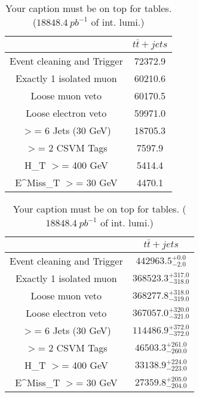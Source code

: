 \documentclass{article}
\begin{document}
\begin{table}
\caption{Your caption must be on top for tables. ($18848.4~pb^{-1}$ of int. lumi.)}
\label{tab:}
\centering
\begin{tabular}{|c|c|}
\toprule
&$t\bar{t}+jets$	\\

\midrule
Event cleaning and Trigger&	72372.9	\\

Exactly 1 isolated muon&	60210.6	\\

Loose muon veto&	60170.5	\\

Loose electron veto&	59971.0	\\

$>$= 6 Jets (30 GeV)&	18705.3	\\

$>$= 2 CSVM Tags&	7597.9	\\

H_{T} $>$=  400 GeV&	5414.4	\\

E^{Miss}_{T} $>$=  30 GeV&	4470.1	\\

\bottomrule
\end{tabular}
\end{table}
\begin{table}
\caption{Your caption must be on top for tables. ($18848.4~pb^{-1}$ of int. lumi.)}
\label{tab:}
\centering
\begin{tabular}{|c|c|}
\toprule
&$t\bar{t}+jets$	\\

\midrule
Event cleaning and Trigger&	$442963.5^{+0.0}_{-2.0}$	\\

Exactly 1 isolated muon&	$368523.3^{+317.0}_{-318.0}$	\\

Loose muon veto&	$368277.8^{+318.0}_{-319.0}$	\\

Loose electron veto&	$367057.0^{+320.0}_{-321.0}$	\\

$>$= 6 Jets (30 GeV)&	$114486.9^{+372.0}_{-372.0}$	\\

$>$= 2 CSVM Tags&	$46503.3^{+261.0}_{-260.0}$	\\

H_{T} $>$=  400 GeV&	$33138.9^{+224.0}_{-223.0}$	\\

E^{Miss}_{T} $>$=  30 GeV&	$27359.8^{+205.0}_{-204.0}$	\\

\bottomrule
\end{tabular}
\end{table}
\end{document}
